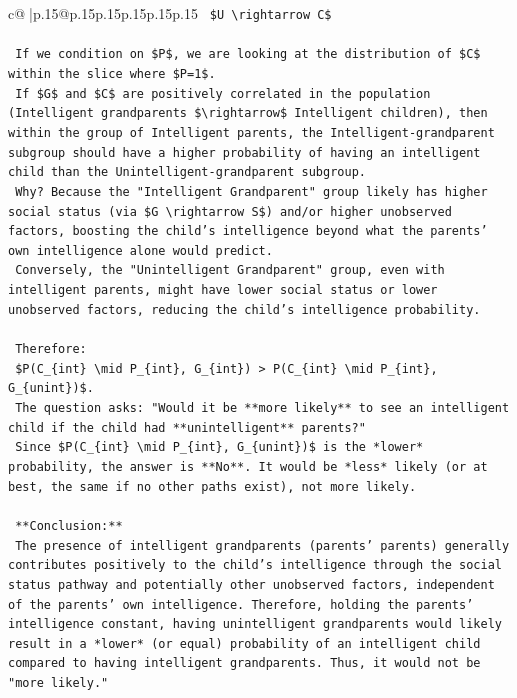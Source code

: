 \documentclass{article}
\begin{document}
{\begin{supertabular}{c@{$\;$}|p{.15\linewidth}@{}p{.15\linewidth}p{.15\linewidth}p{.15\linewidth}p{.15\linewidth}p{.15\linewidth}}
{{{\texttt{    \$U \textbackslash{}rightarrow C\$} \\
\\ 
\texttt{    If we condition on \$P\$, we are looking at the distribution of \$C\$ within the slice where \$P=1\$.} \\
\texttt{    If \$G\$ and \$C\$ are positively correlated in the population (Intelligent grandparents \$\textbackslash{}rightarrow\$ Intelligent children), then within the group of Intelligent parents, the Intelligent{-}grandparent subgroup should have a higher probability of having an intelligent child than the Unintelligent{-}grandparent subgroup.} \\
\texttt{    Why? Because the "Intelligent Grandparent" group likely has higher social status (via \$G \textbackslash{}rightarrow S\$) and/or higher unobserved factors, boosting the child's intelligence beyond what the parents' own intelligence alone would predict.} \\
\texttt{    Conversely, the "Unintelligent Grandparent" group, even with intelligent parents, might have lower social status or lower unobserved factors, reducing the child's intelligence probability.} \\
\\ 
\texttt{    Therefore:} \\
\texttt{    \$P(C\_\{int\} \textbackslash{}mid P\_\{int\}, G\_\{int\}) > P(C\_\{int\} \textbackslash{}mid P\_\{int\}, G\_\{unint\})\$.} \\
\texttt{    The question asks: "Would it be **more likely** to see an intelligent child if the child had **unintelligent** parents?"} \\
\texttt{    Since \$P(C\_\{int\} \textbackslash{}mid P\_\{int\}, G\_\{unint\})\$ is the *lower* probability, the answer is **No**. It would be *less* likely (or at best, the same if no other paths exist), not more likely.} \\
\\ 
\texttt{    **Conclusion:**} \\
\texttt{    The presence of intelligent grandparents (parents' parents) generally contributes positively to the child's intelligence through the social status pathway and potentially other unobserved factors, independent of the parents' own intelligence. Therefore, holding the parents' intelligence constant, having unintelligent grandparents would likely result in a *lower* (or equal) probability of an intelligent child compared to having intelligent grandparents. Thus, it would not be "more likely."} \\
}}}
\end{supertabular}}
\end{document}
